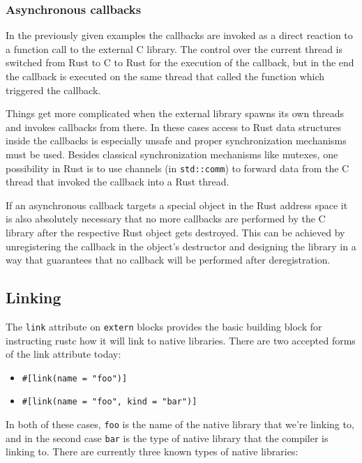 \documentclass[a4paper,]{book}
\begin{document}
\subsubsection{Asynchronous callbacks}\label{asynchronous-callbacks}

In the previously given examples the callbacks are invoked as a direct
reaction to a function call to the external C library. The control over
the current thread is switched from Rust to C to Rust for the execution
of the callback, but in the end the callback is executed on the same
thread that called the function which triggered the callback.

Things get more complicated when the external library spawns its own
threads and invokes callbacks from there. In these cases access to Rust
data structures inside the callbacks is especially unsafe and proper
synchronization mechanisms must be used. Besides classical
synchronization mechanisms like mutexes, one possibility in Rust is to
use channels (in \texttt{std::comm}) to forward data from the C thread
that invoked the callback into a Rust thread.

If an asynchronous callback targets a special object in the Rust address
space it is also absolutely necessary that no more callbacks are
performed by the C library after the respective Rust object gets
destroyed. This can be achieved by unregistering the callback in the
object's destructor and designing the library in a way that guarantees
that no callback will be performed after deregistration.

\subsection{Linking}\label{linking}

The \texttt{link} attribute on \texttt{extern} blocks provides the basic
building block for instructing rustc how it will link to native
libraries. There are two accepted forms of the link attribute today:

\begin{itemize}
\itemsep1pt\parskip0pt
\item
  \texttt{\#{[}link(name\ =\ "foo"){]}}
\item
  \texttt{\#{[}link(name\ =\ "foo",\ kind\ =\ "bar"){]}}
\end{itemize}

In both of these cases, \texttt{foo} is the name of the native library
that we're linking to, and in the second case \texttt{bar} is the type
of native library that the compiler is linking to. There are currently
three known types of native libraries:
\end{document}
